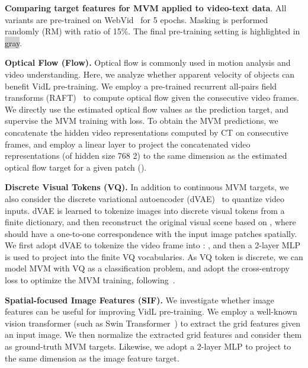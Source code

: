 \documentclass[10pt,twocolumn,letterpaper]{article}
\begin{document}
\begin{table*}[t]
    \caption{\textbf{Comparing target features for MVM applied to video-text data}. All variants are pre-trained on WebVid~\cite{bain2021frozen} for 5 epochs. Masking is performed randomly (RM) with ratio of 15\%. The final pre-training setting is highlighted in \colorbox{lightgray}{gray}. }
    \label{table:mvm-webvid}
\end{table*} 
\vspace{0.5ex}
\noindent \textbf{Optical Flow (Flow).} Optical flow is commonly used in motion analysis and video understanding. Here, we analyze whether apparent velocity of objects can benefit VidL pre-training. We employ a pre-trained recurrent all-pairs field transforms (RAFT)~\cite{teed2020raft} to compute optical flow given the consecutive video frames. We directly use the estimated optical flow values as the prediction target, and supervise the MVM training with  loss.  To obtain the MVM predictions, we concatenate the hidden video representations computed by CT on consecutive frames, and employ a linear layer to project the concatenated video representations (of hidden size 768  2) to the same dimension as the estimated optical flow target for a given patch ().



\vspace{0.5ex}
\noindent \textbf{Discrete Visual Tokens (VQ).} In addition to continuous MVM targets, we also consider the discrete variational autoencoder (dVAE)~\cite{oord2017vq-vae,ramesh2021dalle} to quantize video inputs. dVAE is learned to tokenize images into discrete visual tokens  from a finite dictionary, and then reconstruct the original visual scene based on , where  should have a one-to-one correspondence with the input image patches spatially. We first adopt dVAE to tokenize the  video frame  into : , and then a 2-layer MLP is used to project  into the finite VQ vocabularies. As VQ token is discrete, we can model MVM with VQ as a classification problem, and adopt the cross-entropy loss to optimize the MVM training, following~\cite{bao2022beit,fu2021violet}. 

\vspace{0.5ex}
\noindent \textbf{Spatial-focused Image Features (SIF).} We investigate whether image features can be useful for improving VidL pre-training. We employ a well-known vision transformer (such as Swin Transformer~\cite{liu2021swin}) to extract the grid features given an input image. We then normalize the extracted grid features and consider them as ground-truth MVM targets. Likewise, we adopt a 2-layer MLP to project  to the same dimension as the image feature target.
\end{document}
